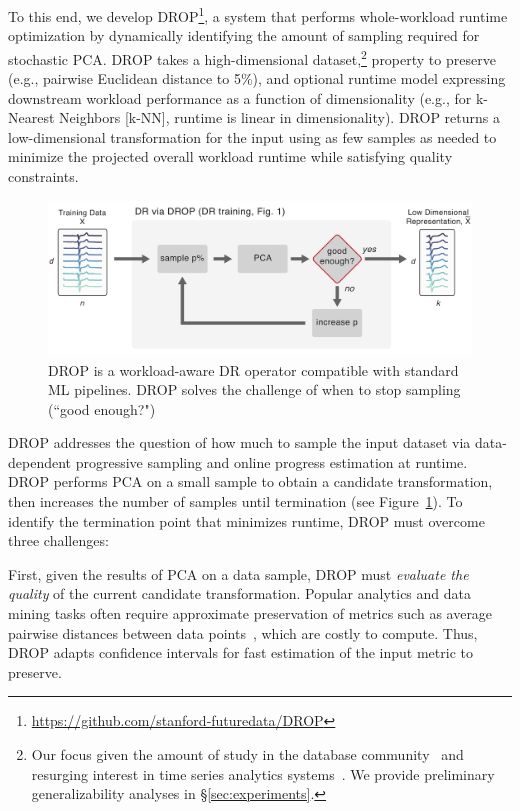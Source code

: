 To this end, we develop DROP\footnote{\href{https://github.com/stanford-futuredata/DROP}{https://github.com/stanford-futuredata/DROP}}, a system that performs whole-workload runtime optimization by dynamically identifying the amount of sampling required for stochastic PCA.
DROP takes a high-dimensional dataset,\footnote{Our focus  given the amount of study in the database community~\cite{keogh-study} and resurging interest in time series analytics systems~\cite{macrobase,macrobase-cidr,trill-signal}. We provide preliminary generalizability analyses in \S\ref{sec:experiments}.}  property to preserve (e.g., pairwise Euclidean distance to 5\%), and optional runtime model expressing downstream workload performance as a function of dimensionality (e.g., for k-Nearest Neighbors [k-NN], runtime is linear in dimensionality). 
DROP returns a low-dimensional transformation for the input using as few samples as needed to minimize the projected overall workload runtime while satisfying quality constraints.

\begin{figure}
\includegraphics[width=\linewidth]{figs/basic.pdf}
\caption[]{DROP is a workload-aware DR operator compatible with standard ML pipelines. DROP solves the challenge of when to stop sampling (``good enough?")}
\label{fig:basic}
\end{figure}

DROP addresses the question of how much to sample the input dataset via data-dependent progressive sampling and online progress estimation at runtime.  
DROP performs PCA on a small sample to obtain a candidate transformation, then increases the number of samples until termination (see Figure~\ref{fig:basic}). 
To identify the termination point that minimizes runtime, DROP must overcome three challenges:

First, given the results of PCA on a data sample, DROP must \emph{evaluate the quality} of the current candidate transformation.
Popular analytics and data mining tasks often require approximate preservation of metrics such as average pairwise distances between data points~\cite{time-series-dm,dm-book}, which are costly to compute.
Thus, DROP adapts confidence intervals for fast estimation of the input metric to preserve.


